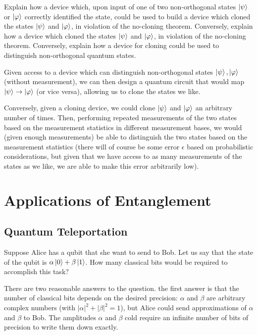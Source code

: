 \begin{example}
    Explain how a device which, upon input of one of two non-orthogonal states $\ket{\psi}$ or $\ket{\varphi}$ correctly identified the state, could be used to build a device which cloned the states $\ket{\psi}$ and $\ket{\varphi}$, in violation of the no-cloning theorem. Conversely, explain how a device which cloned the states $\ket{\psi}$ and $\ket{\varphi}$, in violation of the no-cloning theorem. Conversely, explain how a device for cloning could be used to distinguish non-orthogonal quantum states.

    Given access to a device which can distinguish non-orthogonal states $\ket{\psi},\ket{\varphi}$ (without measurement), we can then design a quantum circuit that would map $\ket{\psi}\rightarrow \ket{\varphi}$ (or vice versa), allowing us to clone the states we like.

    Conversely, given a cloning device, we could clone $\ket{\psi}$ and $\ket{\varphi}$ an arbitrary number of times. Then, performing repeated measurements of the two states based on the measurement statistics in different measurement bases, we would (given enough measurements) be able to distinguish the two states based on the measurement statistics (there will of course be some error $\epsilon$ based on probabilistic considerations, but given that we have access to as many measurements of the states as we like, we are able to make this error arbitrarily low).
\end{example}




\section{Applications of Entanglement}
\subsection{Quantum Teleportation}
Suppose Alice has a qubit that she want to send to Bob. Let us say that the state of the qubit is $\alpha\ket{0}+\beta\ket{1}$. How many classical bits would be required to accomplish this task?

There are two reasonable answers to the question. the first answer is that the number of classical bits depends on the desired precision: $\alpha$ and $\beta$ are arbitrary complex numbers (with $|\alpha|^2 +|\beta|^2=1$), but Alice could send approximations of $\alpha$ and $\beta$ to Bob. The amplitudes $\alpha$ and $\beta$ cold require an infinite number of bits of precision to write them down exactly.

